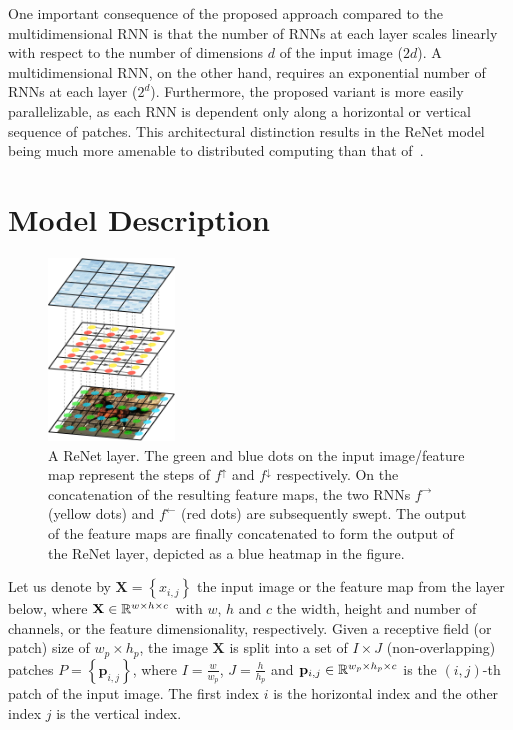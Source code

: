 One important consequence of the proposed approach compared to the
multidimensional RNN is that the number of RNNs at each layer scales linearly
with respect to the number of dimensions $d$ of the input image ($2d$). A
multidimensional RNN, on the other hand, requires an exponential number of RNNs
at each layer ($2^d$). Furthermore, the proposed variant is more easily
parallelizable, as each RNN is dependent only along a horizontal or vertical
sequence of patches. This architectural distinction results in the ReNet model
being much more amenable to distributed computing than that
of~\citet{Graves+Schmidhuber-2009}.


\section{Model Description}\label{sec:renet_model}

\begin{figure}[t]
    \centering
    \includegraphics[width=0.3\textwidth]{img/renet/renet_first_layer.pdf}
    \caption{A ReNet layer. The green and blue dots on the input image/feature
        map represent the steps of $f^\uparrow$ and $f^\downarrow$
        respectively. On the concatenation of the resulting feature maps, the
        two RNNs $f^\rightarrow$ (yellow dots) and $f^\leftarrow$ (red dots)
        are subsequently swept. The output of the feature maps are finally
        concatenated to form the output of the ReNet layer, depicted as a blue
        heatmap in the figure.}
    \label{fig:renet_layer}
    \vspace{-3mm}
\end{figure}

Let us denote by $\mathbf{X}=\left\{x_{i,j}\right\}$ the input image or the
feature map from the layer below, where $\mathbf{X} \in \mathbb{R}^{w \times h \times
c}$ with $w$, $h$ and $c$ the width, height and number of channels, or the
feature dimensionality, respectively. Given a receptive field (or patch) size
of $w_p \times h_p$, the image $\mathbf{X}$ is split into a set of $I \times J$
(non-overlapping) patches $P = \left\{ \mathbf{p}_{i,j} \right\}$, where $I =
\frac{w}{w_p}$, $J = \frac{h}{h_p}$ and $\mathbf{p}_{i,j} \in \mathbb{R}^{w_p \times
h_p \times c}$ is the $(i,j)$-th patch of the input image. The first index $i$
is the horizontal index and the other index $j$ is the vertical index.

